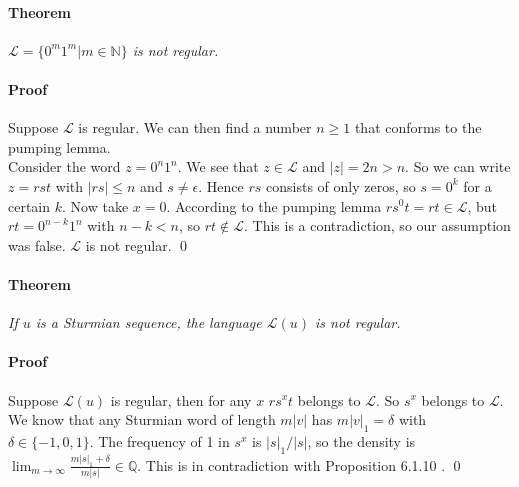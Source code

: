 \documentclass{article}
\begin{document}
\paragraph{Theorem} \emph{$\mathcal{L} = \{0^m1^m | m \in \mathbb{N}\}$ is not 
regular.}

\paragraph{Proof}
Suppose $\mathcal{L}$ is regular. We can then find a number $n \ge 1$ that
conforms to the pumping lemma.\\
Consider the word $z = 0^n 1^n$. We see that $z \in \mathcal{L}$ and
$|z| = 2n > n$. So we can write $z = r s t$ with $|r s| \le n$ and
$s \ne \epsilon$. Hence $rs$ consists of only zeros, so $s = 0^k$ for a certain
$k$. Now take $x = 0$. According to the pumping lemma
$r s^0 t = r t \in \mathcal{L}$, but $r t = 0^{n - k} 1^n$ with $n - k < n$, so
$rt \notin \mathcal{L}$. This is a contradiction, so our assumption was false.
$\mathcal{L}$ is not regular. \qed

\paragraph{Theorem} \emph{If $u$ is a Sturmian sequence, the language 
$\mathcal{L}(u)$ is not regular.}

\paragraph{Proof}
Suppose $\mathcal{L}(u)$ is regular, then for any $x$ $r s^x t$ belongs to
$\mathcal{L}$. So $s^x$ belongs to $\mathcal{L}$. We know that any Sturmian
word of length $m|v|$ has $m|v|_1 = \delta$ with $\delta \in \{-1, 0 , 1\}$.
The frequency of 1 in $s^x$ is $|s|_1 / |s|$, so the density is
$\lim_{m \to \infty} \frac{m|s|_1 + \delta}{m|s|} \in \mathbb{Q}$. This is in
contradiction with Proposition 6.1.10 \cite{F2}. \qed
\end{document}
